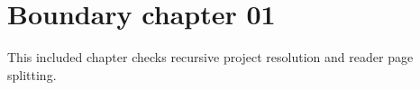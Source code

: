 \section{Boundary chapter 01}
\label{sec:boundary-01}
This included chapter checks recursive project resolution and reader page splitting.
